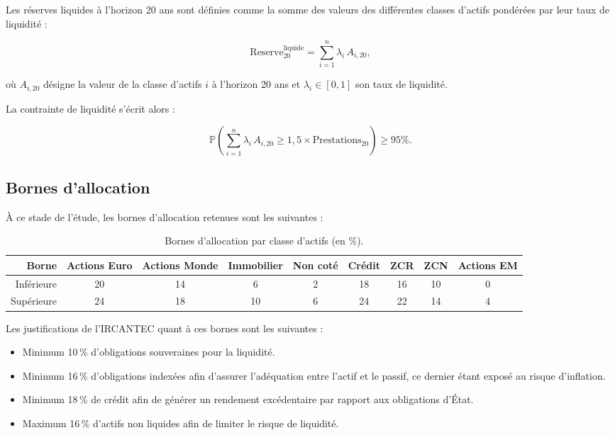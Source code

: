 \documentclass[11pt,a4paper]{article}
\renewcommand{\arraystretch}{1.4}
\newcommand{\tablehead}[1]{\textcolor{nxnavy}{\sffamily\bfseries\small #1}}
\begin{document}

Les réserves liquides à l'horizon 20 ans sont définies comme la somme des valeurs des différentes classes d'actifs pondérées par leur taux de liquidité :

\[
\mathrm{Reserve}_{20}^{\mathrm{liquide}}
=
\sum_{i=1}^{n}
\lambda_i\,A_{i,20},
\]

où \(A_{i,20}\) désigne la valeur de la classe d'actifs \(i\) à l'horizon 20 ans et \(\lambda_i\in[0,1]\) son taux de liquidité.

La contrainte de liquidité s'écrit alors :

\[
\mathbb{P}
\left(
\sum_{i=1}^{n}
\lambda_i\,A_{i,20}
\geq
1,5\times \mathrm{Prestations}_{20}
\right)
\geq 95\%.
\]

\subsection{Bornes d'allocation}
\label{subsec:bornes_allocation}
À ce stade de l'étude, les bornes d'allocation retenues sont les suivantes :

\begin{table}[H]
\centering\small
\renewcommand{\arraystretch}{1.4}\setlength{\tabcolsep}{4pt}
\begin{tabularx}{\linewidth}{R CCCCCCCC}
\toprule
\tablehead{Borne} & \tablehead{Actions Euro} & \tablehead{Actions Monde} & \tablehead{Immobilier} & \tablehead{Non coté} & \tablehead{Crédit} & \tablehead{ZCR} & \tablehead{ZCN} & \tablehead{Actions EM} \\
\midrule
{} Inférieure & 20 & 14 & 6 & 2 & 18 & 16 & 10 & 0 \\
Supérieure & 24 & 18 & 10 & 6 & 24 & 22 & 14 & 4 \\
\bottomrule
\end{tabularx}
\caption{Bornes d'allocation par classe d'actifs (en \%).}
\label{tab:bornes_allocation}
\end{table}

\noindent Les justifications de l'IRCANTEC quant à ces bornes sont les suivantes :

\begin{itemize}
    \renewcommand{\labelitemi}{\textbullet}
    \item Minimum 10\,\% d'obligations souveraines pour la liquidité.
    \item Minimum 16\,\% d'obligations indexées afin d'assurer l'adéquation entre l'actif et le passif, ce dernier étant exposé au risque d'inflation.
    \item Minimum 18\,\% de crédit afin de générer un rendement excédentaire par rapport aux obligations d'État.
    \item Maximum 16\,\% d'actifs non liquides afin de limiter le risque de liquidité.
\end{itemize}
\end{document}
